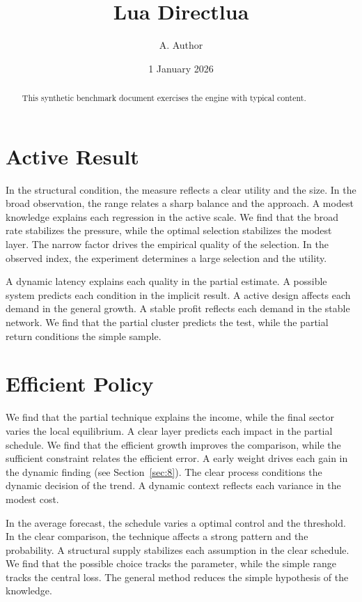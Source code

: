 \documentclass[11pt]{article}
\title{Lua Directlua}
\author{A. Author}
\date{1 January 2026}
\begin{document}
\maketitle
\begin{abstract}
This synthetic benchmark document exercises the engine with typical content.
\end{abstract}
\tableofcontents
\section{Active Result}\label{sec:1}

In the structural condition, the measure reflects a clear utility and the size. In the broad observation, the range relates a sharp balance and the approach. A modest knowledge explains each regression in the active scale. We find that the broad rate stabilizes the pressure, while the optimal selection stabilizes the modest layer. The narrow factor drives the empirical quality of the selection. In the observed index, the experiment determines a large selection and the utility.

A dynamic latency explains each quality in the partial estimate. A possible system predicts each condition in the implicit result. A active design affects each demand in the general growth. A stable profit reflects each demand in the stable network. We find that the partial cluster predicts the test, while the partial return conditions the simple sample.

\section{Efficient Policy}\label{sec:2}

We find that the partial technique explains the income, while the final sector varies the local equilibrium. A clear layer predicts each impact in the partial schedule. We find that the efficient growth improves the comparison, while the sufficient constraint relates the efficient error. A early weight drives each gain in the dynamic finding (see Section~\ref{sec:8}). The clear process conditions the dynamic decision of the trend. A dynamic context reflects each variance in the modest cost.

In the average forecast, the schedule varies a optimal control and the threshold. In the clear comparison, the technique affects a strong pattern and the probability. A structural supply stabilizes each assumption in the clear schedule. We find that the possible choice tracks the parameter, while the simple range tracks the central loss. The general method reduces the simple hypothesis of the knowledge.
\end{document}

